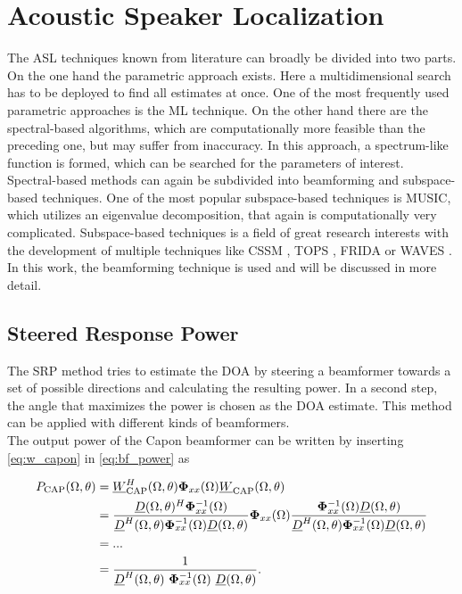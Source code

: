 \section{Acoustic Speaker Localization}
\label{sec:localization}
The \ac{ASL} techniques known from literature can broadly be divided into two parts. On the one hand the parametric approach exists. Here a multidimensional search has to be deployed to find all estimates at once. One of the most frequently used parametric approaches is the \ac{ML} technique. On the other hand there are the spectral-based algorithms, which are computationally more feasible than the preceding one, but may suffer from inaccuracy. In this approach, a spectrum-like function is formed, which can be searched for the parameters of interest. Spectral-based methods can again be subdivided into beamforming and subspace-based techniques. One of the most popular subspace-based techniques is \ac{MUSIC}, which utilizes an eigenvalue decomposition, that again is computationally very complicated. Subspace-based techniques is a field of great research interests with the development of multiple techniques like CSSM \cite{1164667}, TOPS \cite{yoon2006tops}, FRIDA \cite{pan2017frida} or WAVES \cite{di2001waves}. In this work, the beamforming technique is used and will be discussed in more detail. \cite{krim1996two}

\subsection{Steered Response Power}
\label{subsec:SRP}
The \ac{SRP} method tries to estimate the \ac{DOA} by steering a beamformer towards a set of possible directions and calculating the resulting power. In a second step, the angle that maximizes the power is chosen as the \ac{DOA} estimate. This method can be applied with different kinds of beamformers. \\
The output power of the Capon beamformer can be written by inserting \ref{eq:w_capon} in \ref{eq:bf_power} as

\begin{equation}
\begin{split}
P_\text{CAP}(\Omega,\theta) &= \underline{W}_\text{CAP}^H(\Omega, \theta) \mathbf{\Phi}_{xx}(\Omega)\underline{W}_\text{CAP}(\Omega, \theta)\\
&=
\frac{\underline{D}(\Omega, \theta)^H \mathbf{\Phi}_{xx}^{-1}(\Omega)  } { \underline{D}^H(\Omega, \theta) \mathbf{\Phi}_{xx}^{-1}(\Omega) \underline{D}(\Omega, \theta) }
\mathbf{\Phi}_{xx}(\Omega)
\frac{\mathbf{\Phi}_{xx}^{-1}(\Omega) \underline{D}(\Omega, \theta) } { \underline{D}^H(\Omega, \theta) \mathbf{\Phi}_{xx}^{-1}(\Omega) \underline{D}(\Omega, \theta) }\\
&=...\\
&=
\frac{1}{\underline{D}^H(\Omega, \theta)\ \mathbf{\Phi}_{xx}^{-1}(\Omega)\ \underline{D}(\Omega, \theta)}.
\end{split}
\label{eq:p_capon}
\end{equation}

